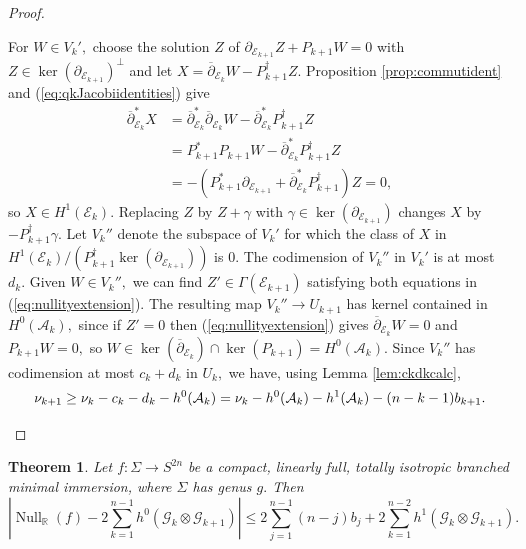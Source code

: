 \documentclass[11pt]{article}
\newtheorem{theorem}{Theorem}[section]
\theoremstyle{definition}
\newcommand{\R}{\mathbb{R}}
\newcommand{\del}{\partial}
\newcommand{\delbar}{\overline{\partial}}
\numberwithin{equation}{section}
\begin{document}
\begin{proof}
\begin{enumerate}[label=(\alph*)]
        For $W \in V_{k}',$ choose the solution $Z$ of $\del_{\mathcal{E}_{k+1}} Z + P_{k+1} W = 0$ with $Z \in \ker (\partial_{\mathcal E_{k+1}})^\perp$ and let $X = \delbar_{\mathcal{E}_{k}} W - P^\dagger_{k+1} Z.$ Proposition \ref{prop:commutident} and (\ref{eq:qkJacobiidentities}) give
        \begin{equation*}
            \begin{aligned}
                \delbar_{\mathcal{E}_k}^* X &= \delbar_{\mathcal{E}_k}^* \delbar_{\mathcal{E}_{k}} W - \delbar_{\mathcal{E}_k}^* P^\dagger_{k+1} Z \\
                &= P_{k+1}^* P_{k+1} W - \delbar_{\mathcal{E}_k}^* P^\dagger_{k+1} Z \\
                &= -\left( P_{k+1}^* \del_{\mathcal{E}_{k+1}} +  \delbar_{\mathcal{E}_k}^* P^\dagger_{k+1} \right) Z = 0,
            \end{aligned}
        \end{equation*}
        so $X \in H^1(\mathcal{E}_k).$ Replacing $Z$ by $Z + \gamma$ with $\gamma \in \ker (\partial_{\mathcal E_{k+1}})$ changes $X$ by $-P_{k+1}^\dagger \gamma.$ Let $V_{k}''$ denote the subspace of $V_k'$ for which the class of $X$ in ${H^1(\mathcal{E}_{k})}/({P^\dagger_{k+1} \ker(\del_{\mathcal{E}_{k+1}})})$ is $0.$ The codimension of $V_{k}''$ in $V_k'$ is at most $d_k.$ Given $W \in V_{k}'',$ we can find $Z' \in \Gamma(\mathcal{E}_{k+1})$ satisfying both equations in (\ref{eq:nullityextension}). The resulting map $V_{k}'' \to U_{k+1}$ has kernel contained in $H^0(\mathcal{A}_k),$ since if $Z' = 0$ then (\ref{eq:nullityextension}) gives $\delbar_{\mathcal{E}_k} W = 0$ and $P_{k+1} W = 0,$ so $W \in \ker(\delbar_{\mathcal{E}_k}) \cap \ker(P_{k+1}) = H^0(\mathcal{A}_k).$ Since $V_k''$ has codimension at most $c_k+d_k$ in $U_k,$ we have, using Lemma \ref{lem:ckdkcalc},
        \begin{equation*}
            \nu_{k+1} \geq \nu_k - c_k - d_k - h^0(\mathcal{A}_k) = \nu_k -h^0(\mathcal{A}_k) - h^1(\mathcal{A}_k) - (n-k-1)b_{k+1}.\qedhere
        \end{equation*}
    \end{enumerate}
\end{proof}

\begin{theorem}\label{thm:nullitybound}
    Let $f: \Sigma \to S^{2n}$ be a compact, linearly full, totally isotropic branched minimal immersion, where $\Sigma$ has genus $g.$ Then
    \begin{equation}
        \left\lvert \operatorname{Null}_\R(f) - 2 \sum_{k=1}^{n-1} h^0(\mathcal{G}_k \otimes \mathcal{G}_{k+1}) \right\rvert \leq 2 \sum_{j=1}^{n-1} (n-j) b_j + 2 \sum_{k=1}^{n-2} h^1(\mathcal{G}_k \otimes \mathcal{G}_{k+1}).
    \end{equation}
\end{theorem}
\end{document}
